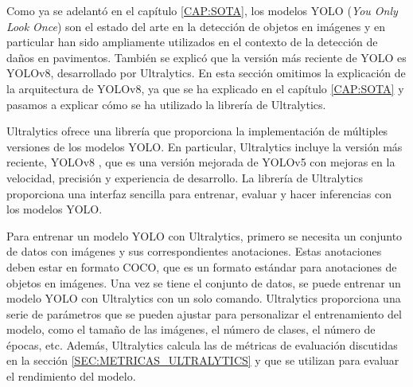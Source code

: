 Como ya se adelantó en el capítulo \ref{CAP:SOTA}, los modelos YOLO (\textit{You Only Look Once}) son el estado del arte en la detección de objetos en imágenes y en particular han sido ampliamente utilizados en el contexto de la detección de daños en pavimentos. También se explicó que la versión más reciente de YOLO es YOLOv8, desarrollado por Ultralytics. En esta sección omitimos la explicación de la arquitectura de YOLOv8, ya que se ha explicado en el capítulo \ref{CAP:SOTA} y pasamos a explicar cómo se ha utilizado la librería de Ultralytics.

Ultralytics ofrece una librería que proporciona la implementación de múltiples versiones de los modelos YOLO. En particular, Ultralytics incluye la versión más reciente, YOLOv8 \cite{yolov8_ultralytics}, que es una versión mejorada de YOLOv5 con mejoras en la velocidad, precisión y experiencia de desarrollo. La librería de Ultralytics proporciona una interfaz sencilla para entrenar, evaluar y hacer inferencias con los modelos YOLO.

Para entrenar un modelo YOLO con Ultralytics, primero se necesita un conjunto de datos con imágenes y sus correspondientes anotaciones. Estas anotaciones deben estar en formato COCO, que es un formato estándar para anotaciones de objetos en imágenes. Una vez se tiene el conjunto de datos, se puede entrenar un modelo YOLO con Ultralytics con un solo comando. Ultralytics proporciona una serie de parámetros que se pueden ajustar para personalizar el entrenamiento del modelo, como el tamaño de las imágenes, el número de clases, el número de épocas, etc. Además, Ultralytics calcula las de métricas de evaluación discutidas en la sección \ref{SEC:METRICAS_ULTRALYTICS} y que se utilizan para evaluar el rendimiento del modelo.
